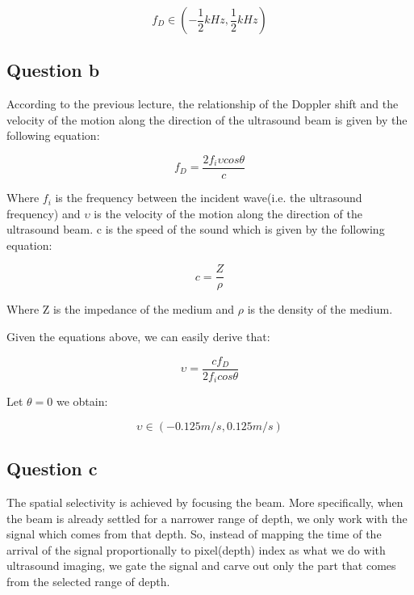 \documentclass[11pt,a4paper,BCOR12mm, headexclude, footexclude, twoside, openright]{scrartcl}
\numberwithin{equation}{section} %
\numberwithin{figure}{section} %
\numberwithin{table}{section} %
\begin{document}
\begin{equation}
     f_D \in (-\frac{1}{2}kHz,\frac{1}{2}kHz)
\end{equation}

\subsection{Question b}
 According to the previous lecture, the relationship of the Doppler shift and the velocity of the motion along the direction of the ultrasound beam is given by the following equation:
 
\begin{equation}
     f_D = \frac{2 f_{i}\upsilon cos \theta}{c}
\end{equation}

Where $f_{i}$ is the frequency between the incident wave(i.e. the ultrasound frequency) and $\upsilon$ is the velocity of the motion along the direction of the ultrasound beam. c is the speed of the sound which is given by the following equation:

\begin{equation}
     c = \frac{Z}{\rho}
\end{equation}

Where Z is the impedance of the medium and $\rho$ is the density of the medium. 

Given the equations above, we can easily derive that:

\begin{equation}
     \upsilon = \frac{ c f_{D}}{2 f_{i} cos \theta}
\end{equation}

Let $\theta = 0$ we obtain:

\begin{equation}
     \upsilon \in (-0.125m/s, 0.125m/s)
\end{equation}

\subsection{Question c}

The spatial selectivity is achieved by focusing the beam. More specifically, when the beam is already settled for a narrower range of depth, we only work with the signal which comes from that depth. So, instead of mapping the time of the arrival of the signal proportionally to pixel(depth) index as what we do with ultrasound imaging, we gate the signal and carve out only the part that comes from the selected range of depth. 
\end{document}
